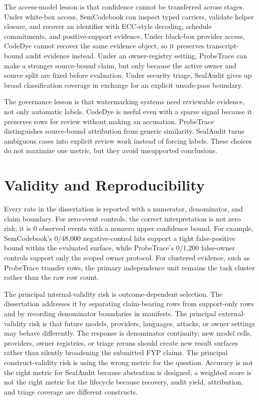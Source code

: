 The access-model lesson is that confidence cannot be transferred across stages. Under white-box access, SemCodebook can inspect typed carriers, validate helper closure, and recover an identifier with ECC-style decoding, schedule commitments, and positive-support evidence. Under black-box provider access, CodeDye cannot recover the same evidence object, so it preserves transcript-bound audit evidence instead. Under an owner-registry setting, ProbeTrace can make a stronger source-bound claim, but only because the active owner and source split are fixed before evaluation. Under security triage, SealAudit gives up broad classification coverage in exchange for an explicit unsafe-pass boundary.

The governance lesson is that watermarking systems need reviewable evidence, not only automatic labels. CodeDye is useful even with a sparse signal because it preserves rows for review without making an accusation. ProbeTrace distinguishes source-bound attribution from generic similarity. SealAudit turns ambiguous cases into explicit review work instead of forcing labels. These choices do not maximize one metric, but they avoid unsupported conclusions.

\section{Validity and Reproducibility}

Every rate in the dissertation is reported with a numerator, denominator, and claim boundary. For zero-event controls, the correct interpretation is not zero risk; it is 0 observed events with a nonzero upper confidence bound. For example, SemCodebook's 0/48,000 negative-control hits support a tight false-positive bound within the evaluated surface, while ProbeTrace's 0/1,200 false-owner controls support only the scoped owner protocol. For clustered evidence, such as ProbeTrace transfer rows, the primary independence unit remains the task cluster rather than the raw row count.

The principal internal-validity risk is outcome-dependent selection. The dissertation addresses it by separating claim-bearing rows from support-only rows and by recording denominator boundaries in manifests. The principal external-validity risk is that future models, providers, languages, attacks, or owner settings may behave differently. The response is denominator continuity: new model cells, providers, owner registries, or triage reruns should create new result surfaces rather than silently broadening the submitted FYP claims. The principal construct-validity risk is using the wrong metric for the question. Accuracy is not the right metric for SealAudit because abstention is designed; a weighted score is not the right metric for the lifecycle because recovery, audit yield, attribution, and triage coverage are different constructs.

